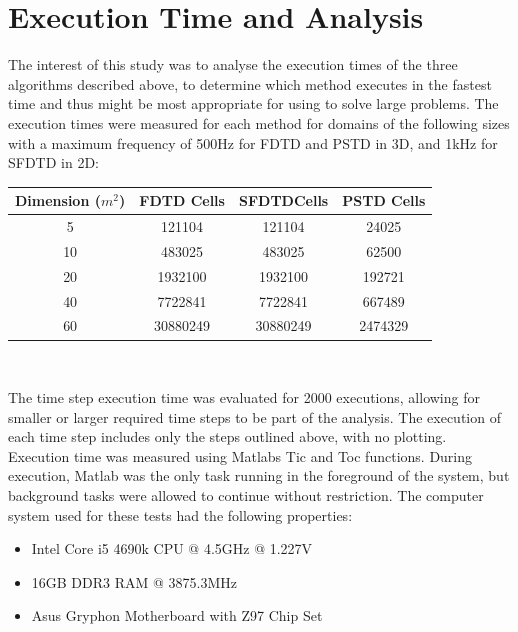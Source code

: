 %
%
%
\chapter{Execution Time and Analysis}
\label{Introduction}
The interest of this study was to analyse the execution times of the three algorithms described above, to determine which method executes in the fastest time and thus might be most appropriate for using to solve large problems. The execution times were measured for each method for domains of the following sizes with a maximum frequency of 500Hz for FDTD and PSTD in 3D, and 1kHz for SFDTD in 2D:\\
\begin{center}
\begin{tabular}{|c|c|c|c|} 
  \hline
 Dimension ($m^2$) & FDTD Cells & SFDTDCells & PSTD Cells \\
 \hline
 5 & 121104	& 121104 & 24025\\ 
 10 & 483025 & 483025 & 62500\\  
 20 & 1932100 & 1932100 & 192721\\ 
 40 & 7722841 & 7722841 & 667489\\ 
 60 & 30880249 & 30880249 & 2474329\\ 
 \hline
\end{tabular}\\
\end{center}

The time step execution time was evaluated for 2000 executions, allowing for smaller or larger required time steps to be part of the analysis. The execution of each time step includes only the steps outlined above, with no plotting. Execution time was measured using Matlabs Tic and Toc functions. During execution, Matlab was the only task running in the foreground of the system, but background tasks were allowed to continue without restriction. The computer system used for these tests had the following properties:\\

\begin{itemize}
\item Intel Core i5 4690k CPU @ 4.5GHz @ 1.227V
\item 16GB DDR3 RAM @ 3875.3MHz
\item Asus Gryphon Motherboard with Z97 Chip Set
\end{itemize}

